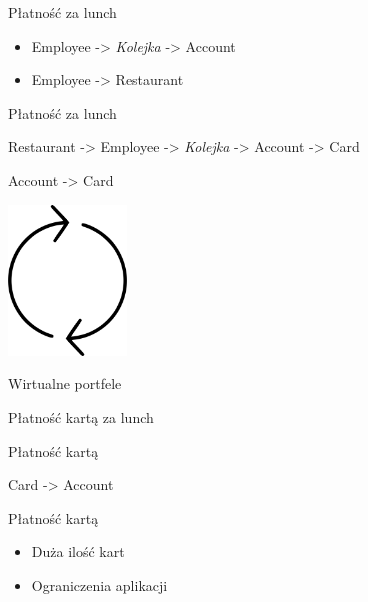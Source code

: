 \documentclass{beamer}
\begin{document}
\begin{frame}{Płatność za lunch}
	\begin{huge}
		\begin{itemize}
			\item Employee -> \textit{Kolejka} -> Account
			\item Employee -> Restaurant
		\end{itemize}
	\end{huge}
\end{frame}

\begin{frame}{Płatność za lunch}
	\begin{center}
		\Huge{Restaurant -> Employee -> \textit{Kolejka} -> Account -> Card}
	\end{center}
\end{frame}

\begin{frame}{Account -> Card}
	\begin{center}
		\includegraphics[height=4cm]{cykl1.png}
	\end{center}
\end{frame}

\begin{frame}{Wirtualne portfele}
	\begin{center}
		\Huge{Płatność kartą za lunch}
	\end{center}
\end{frame}

\begin{frame}{Płatność kartą}
	\begin{center}
		\Huge{Card -> Account}
	\end{center}
\end{frame}

\begin{frame}{Płatność kartą}
	\begin{huge}
		\begin{itemize}
			\item Duża ilość kart
			\item Ograniczenia aplikacji
		\end{itemize}
	\end{huge}
\end{frame}
\end{document}
